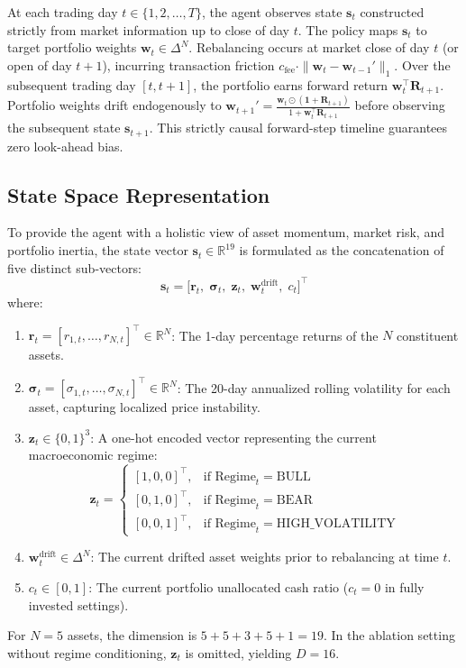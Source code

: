 \documentclass[conference]{IEEEtran}
\begin{document}
At each trading day $t \in \{1, 2, \dots, T\}$, the agent observes state $\mathbf{s}_t$ constructed strictly from market information up to close of day $t$. The policy maps $\mathbf{s}_t$ to target portfolio weights $\mathbf{w}_t \in \Delta^N$. Rebalancing occurs at market close of day $t$ (or open of day $t+1$), incurring transaction friction $c_{\text{fee}} \cdot \|\mathbf{w}_t - \mathbf{w}_{t-1}'\|_1$. Over the subsequent trading day $[t, t+1]$, the portfolio earns forward return $\mathbf{w}_t^\top \mathbf{R}_{t+1}$. Portfolio weights drift endogenously to $\mathbf{w}_{t+1}' = \frac{\mathbf{w}_t \odot (\mathbf{1} + \mathbf{R}_{t+1})}{1 + \mathbf{w}_t^\top \mathbf{R}_{t+1}}$ before observing the subsequent state $\mathbf{s}_{t+1}$. This strictly causal forward-step timeline guarantees zero look-ahead bias.

\subsection{State Space Representation}
To provide the agent with a holistic view of asset momentum, market risk, and portfolio inertia, the state vector $\mathbf{s}_t \in \mathbb{R}^{19}$ is formulated as the concatenation of five distinct sub-vectors:
\begin{equation}
    \mathbf{s}_t = \big[ \mathbf{r}_t, \; \boldsymbol{\sigma}_t, \; \mathbf{z}_t, \; \mathbf{w}_t^{\text{drift}}, \; c_t \big]^\top
\end{equation}
where:
\begin{enumerate}
    \item $\mathbf{r}_t = [r_{1,t}, \dots, r_{N,t}]^\top \in \mathbb{R}^N$: The 1-day percentage returns of the $N$ constituent assets.
    \item $\boldsymbol{\sigma}_t = [\sigma_{1,t}, \dots, \sigma_{N,t}]^\top \in \mathbb{R}^N$: The 20-day annualized rolling volatility for each asset, capturing localized price instability.
    \item $\mathbf{z}_t \in \{0, 1\}^3$: A one-hot encoded vector representing the current macroeconomic regime:
    \begin{equation}
        \mathbf{z}_t = 
        \begin{cases}
            [1, 0, 0]^\top, & \text{if Regime}_t = \text{BULL} \\
            [0, 1, 0]^\top, & \text{if Regime}_t = \text{BEAR} \\
            [0, 0, 1]^\top, & \text{if Regime}_t = \text{HIGH\_VOLATILITY}
        \end{cases}
    \end{equation}
    \item $\mathbf{w}_t^{\text{drift}} \in \Delta^N$: The current drifted asset weights prior to rebalancing at time $t$.
    \item $c_t \in [0, 1]$: The current portfolio unallocated cash ratio ($c_t = 0$ in fully invested settings).
\end{enumerate}
For $N = 5$ assets, the dimension is $5 + 5 + 3 + 5 + 1 = 19$. In the ablation setting without regime conditioning, $\mathbf{z}_t$ is omitted, yielding $D = 16$.
\end{document}
